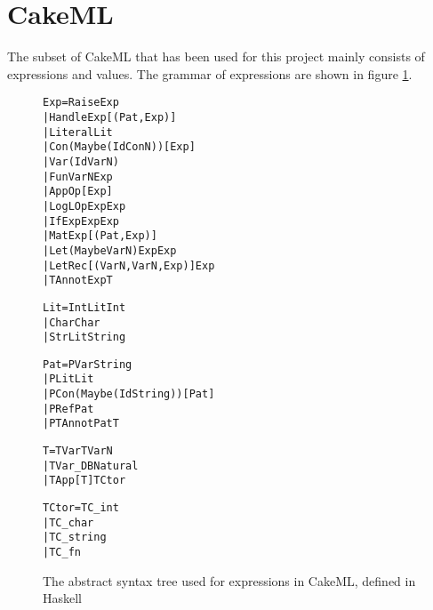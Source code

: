 \section{CakeML}

The subset of CakeML that has been used for this project mainly
consists of expressions and values.
The grammar of expressions are shown in figure \ref{CakeAST}.

\vspace{\fboxsep}
\begin{figure}
\begin{alltt}
  Exp   = Raise Exp
        | Handle Exp [(Pat, Exp)]
        | Literal Lit
        | Con (Maybe (Id ConN)) [Exp]
        | Var (Id VarN)
        | Fun VarN Exp
        | App Op [Exp]
        | Log LOp Exp Exp
        | If Exp Exp Exp
        | Mat Exp [(Pat, Exp)]
        | Let (Maybe VarN) Exp Exp
        | LetRec [(VarN, VarN, Exp)] Exp
        | TAnnot Exp T
\end{alltt}
\begin{alltt}
  Lit   = IntLit Int
        | Char Char
        | StrLit String
\end{alltt}
\begin{alltt}
  Pat   = PVar String
        | PLit Lit
        | PCon (Maybe (Id String)) [Pat]
        | PRef Pat
        | PTAnnot Pat T
\end{alltt}
\begin{alltt}
  T     = TVar TVarN
        | TVar_DB Natural
        | TApp [T] TCtor
\end{alltt}
\begin{alltt}
  TCtor = TC_int
        | TC_char
        | TC_string
        | TC_fn
\end{alltt}
\caption[CakeAST]{The abstract syntax tree used for expressions in CakeML, defined in Haskell}
\label{CakeAST}
\end{figure}
\vspace{\fboxsep}
